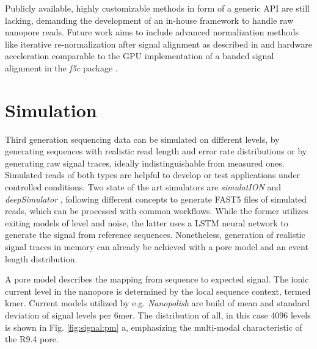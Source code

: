 Publicly available, highly customizable methods in form of a generic API are still lacking, demanding the development of an in-house framework to handle raw nanopore reads. Future work aims to include advanced normalization methods like iterative re-normalization after signal alignment as described in \cite{Boza2017} and hardware acceleration comparable to the GPU implementation of a banded signal alignment in the \textit{f5c} package \cite{Gamaarachchi2020}.




\section{Simulation}
\label{sec:signal:simulation}

Third generation sequencing data can be simulated on different levels, by generating sequences with realistic read length and error rate distributions or by generating raw signal traces, ideally indistinguishable from measured ones. Simulated reads of both types are helpful to develop or test applications under controlled conditions. Two state of the art simulators are \textit{simulatION} \cite{Rohrandt2018} and \textit{deepSimulator} \cite{Li2020}, following different concepts to generate FAST5 files of simulated reads, which can be processed with common workflows. While the former utilizes exiting models of level and noise, the latter uses a LSTM neural network to generate the signal from reference sequences. Nonetheless, generation of realistic signal traces in memory can already be achieved with a pore model and an event length distribution.

A pore model describes the mapping from sequence to expected signal. The ionic current level in the nanopore is determined by the local sequence context, termed kmer. Current models utilized by e.g. \textit{Nanopolish} are build of mean and standard deviation of signal levels per 6mer. The distribution of all, in this case 4096 levels is shown in Fig. \ref{fig:signal:pm} a, emphasizing the multi-modal characteristic of the R9.4 pore.

